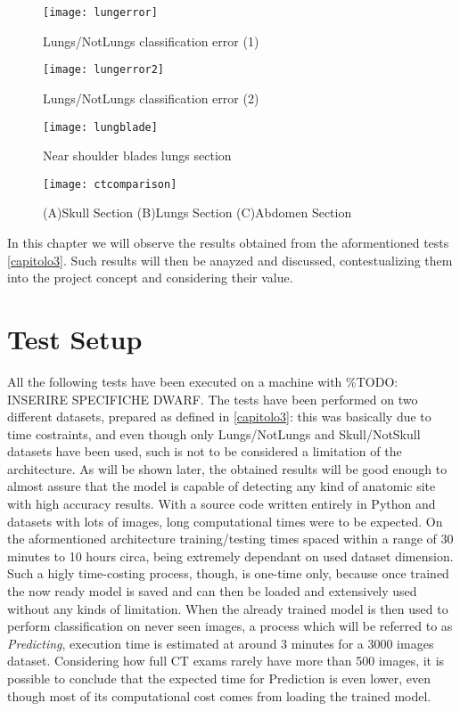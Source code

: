 \documentclass[../main.tex]{subfiles}
\begin{document}
\label{capitolo4}
\thispagestyle{empty}

\begin{figure}[b]
\caption{Lungs/NotLungs classification error (1)}
\centering
\texttt{[image: lungerror]}
\label{lungerror}
\end{figure}

\begin{figure}[b]
\caption{Lungs/NotLungs classification error (2)}
\centering
\texttt{[image: lungerror2]}
\label{lungerror2}
\end{figure}

\begin{figure}[b]
\caption{Near shoulder blades lungs section}
\centering
\texttt{[image: lungblade]}
\label{lungblade}
\end{figure}

\begin{figure}[b]
\caption{(A)Skull Section (B)Lungs Section (C)Abdomen Section}
\centering
\texttt{[image: ctcomparison]}
\label{ctcomparison}
\end{figure}

In this chapter we will observe the results obtained from the aformentioned tests \ref{capitolo3}. Such results will then be anayzed and discussed, contestualizing them into the project concept and considering their value.

\section{Test Setup}
All the following tests have been executed on a machine with \%TODO: INSERIRE SPECIFICHE DWARF.
The tests have been performed on two different datasets, prepared as defined in \ref{capitolo3}: this was basically due to time costraints, and even though only Lungs/NotLungs and Skull/NotSkull datasets have been used, such is not to be considered a limitation of the architecture. As will be shown later, the obtained results will be good enough to almost assure that the model is capable of detecting any kind of anatomic site with high accuracy results.
With a source code written entirely in Python and datasets with lots of images, long computational times were to be expected. On the aformentioned architecture training/testing times spaced within a range of 30 minutes to 10 hours circa, being extremely dependant on used dataset dimension. Such a higly time-costing process, though, is one-time only, because once trained the now ready model is saved and can then be loaded and extensively used without any kinds of limitation. When the already trained model is then used to perform classification on never seen images, a process which will be referred to as \textit{Predicting}, execution time is estimated at around 3 minutes for a 3000 images dataset. Considering how full CT exams rarely have more than 500 images, it is possible to conclude that the expected time for Prediction is even lower, even though most of its computational cost comes from loading the trained model.
\end{document}
